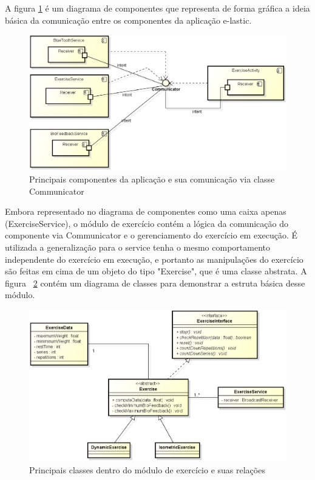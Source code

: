 A figura \ref{diagramaComponentes} é um diagrama de componentes que representa de forma gráfica a ideia básica da comunicação entre os componentes da aplicação e-lastic.

\begin{figure}[!htb]
\centering
\includegraphics [keepaspectratio=true,scale=0.60]{figuras/diagramaComponentes.eps}
\caption{Principais componentes da aplicação e sua comunicação via classe Communicator}
\label{diagramaComponentes}
\end{figure}

Embora representado no diagrama de componentes como uma caixa apenas (ExerciseService), o módulo de exercício contém a lógica da comunicação do componente via Communicator e o gerenciamento do exercício em execução. É utilizada a generalização para o service tenha o mesmo comportamento independente do exercício em execução, e portanto as manipulações do exercício são feitas em cima de um objeto do tipo "Exercise", que é uma classe abstrata. A figura ~\ref{diagramaExercicios} contém um diagrama de classes para demonstrar a estruta básica desse módulo.

\begin{figure}[!htb]
\centering
\includegraphics [keepaspectratio=true,scale=0.60]{figuras/diagramaExercicios.eps}
\caption{Principais classes dentro do módulo de exercício e suas relações}
\label{diagramaExercicios}
\end{figure}

